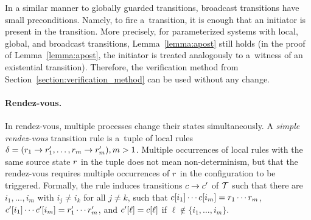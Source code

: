 In a similar manner to globally guarded transitions, broadcast
transitions have small preconditions.  Namely, to fire a~transition,
it is enough that an initiator is present in the transition.
%
More precisely, for parameterized systems with local, global, and
broadcast transitions, Lemma~\ref{lemma:apost} still holds (in the
proof of Lemma~\ref{lemma:apost}, the initiator is treated analogously
to a~witness of an existential transition).
%
Therefore, the verification method from
Section~\ref{section:verification_method} can be used without any
change.


\paragraph{Rendez-vous.}

In rendez-vous, multiple processes change their states simultaneously.
A \emph{simple rendez-vous} transition rule is a~tuple of local rules
$\delta = (r_1\rightarrow r_1',\ldots,r_m\rightarrow r_m'),m>1$.
%
Multiple occurrences of local rules with the same source state $r$
in the tuple does not mean non-determinism, but that the rendez-vous
requires multiple occurrences of $r$ in the configuration to be
triggered.
%
Formally, the rule induces transitions $c\rightarrow c'$ of
${\mathcal T}$ such that there are ${i_1},\ldots,{i_m}$ with $i_j\neq i_k$
for all $j\neq k$, such that $c[i_1]\cdots c[i_m] =
r_1\cdots r_m$, $c'[i_1]\cdots c'[i_m] =
r_1'\cdots r_m' $, and $c'[\ell]=c[\ell]$ if
$\ell\not\in\{{i_1},\ldots,{i_m}\}$.

%

